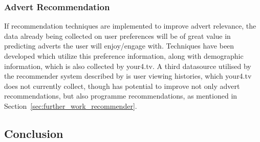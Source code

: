 	\subsubsection{Advert Recommendation}

	If recommendation techniques are implemented to improve advert relevance, the data already being collected on user preferences will be of great value in predicting adverts the user will enjoy/engage with. Techniques have been developed \cite{contextual_advertising} which utilize this preference information, along with demographic \cite{contextual_advertising} information, which is also collected by your4.tv. A third datasource utilised by the recommender system described by \cite{contextual_advertising} is user viewing histories, which your4.tv does not currently collect, though has potential to improve not only advert recommendations, but also programme recommendations, as mentioned in Section~\ref{sec:further_work_recommender}.

	\subsection{Conclusion}
